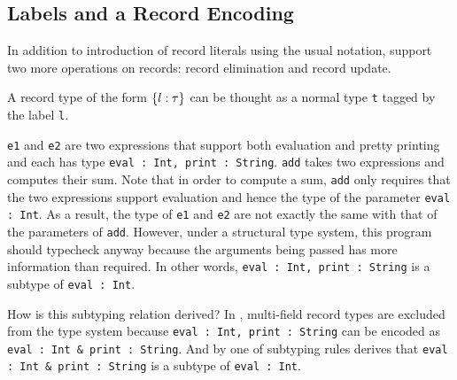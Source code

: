 {%

\subsection{Labels and a Record Encoding}

In addition to introduction of record literals using the usual
notation, \name support two more operations on records: record
elimination and record update.

A record type of the form $ \{ l : \tau \} $ can be thought as a normal type \lstinline{t}
tagged by the label \lstinline{l}.



\lstinline{e1} and \lstinline{e2} are two expressions that support both evaluation and pretty
printing and each has type \lstinline{eval : Int, print : String}. \lstinline{add} takes
two expressions and computes their sum. Note that in order to compute a sum,
\lstinline{add} only requires that the two expressions support evaluation and hence the
type of the parameter \lstinline{eval : Int}. As a result, the type of \lstinline{e1} and
\lstinline{e2} are not exactly the same with that of the parameters of \lstinline{add}. However,
under a structural type system, this program should typecheck anyway because the
arguments being passed has more information than required. In other words,
\lstinline{eval : Int, print : String} is a subtype of \lstinline{eval : Int}.

How is this subtyping relation derived? In \name, multi-field record types are
excluded from the type system because \lstinline{eval : Int, print : String} can
be encoded as \lstinline{eval : Int & print : String}. And by one of
subtyping rules derives that \lstinline{eval : Int & print : String} is a
subtype of \lstinline{eval : Int}.


}
